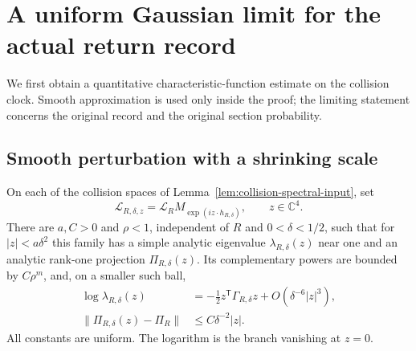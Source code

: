 \section{A uniform Gaussian limit for the actual return record}
\label{sec:stopped-gaussian}
We first obtain a quantitative characteristic-function estimate on the
collision clock. Smooth approximation is used only inside the proof;
the limiting statement concerns the original record and the original
section probability.

\subsection{Smooth perturbation with a shrinking scale}
\begin{lemma}
\label{lem:smooth-collision-expansion}
On each of the collision spaces of
Lemma~\ref{lem:collision-spectral-input}, set
\[
 \mathcal L_{R,\delta,z}
       =\mathcal L_R M_{\exp(i z\cdot h_{R,\delta})},
       \qquad z\in\mathbb C^4.
\]
There are $a,C>0$ and $\rho<1$, independent of $R$ and
$0<\delta<1/2$, such that for $|z|<a\delta^2$ this family has a simple
analytic eigenvalue $\lambda_{R,\delta}(z)$ near one and an analytic
rank-one projection $\Pi_{R,\delta}(z)$. Its complementary powers are
bounded by $C\rho^m$, and, on a smaller such ball,
\begin{equation}\label{eq:smooth-cubic-expansion}
 \begin{split}
 \log\lambda_{R,\delta}(z)
       &=-\tfrac12z^{\mathsf T}\Gamma_{R,\delta}z
                  +O(\delta^{-6}|z|^3),\\
 \|\Pi_{R,\delta}(z)-\Pi_R\|
       &\le C\delta^{-2}|z| .
 \end{split}
\end{equation}
All constants are uniform. The logarithm is the branch vanishing at
$z=0$.
\end{lemma}
